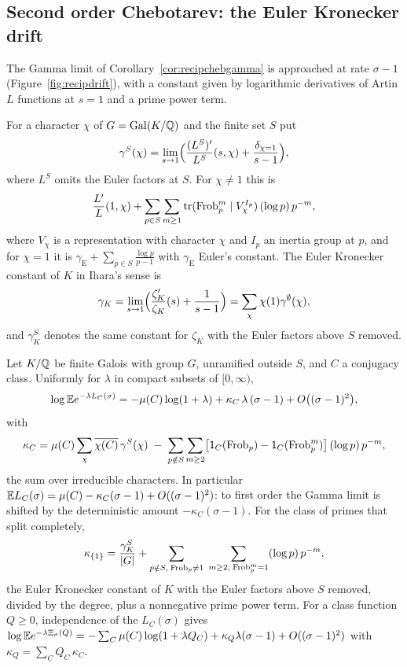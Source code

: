 \subsection{Second order Chebotarev: the Euler Kronecker drift}

The Gamma limit of Corollary~\ref{cor:recipchebgamma} is approached at rate $\sigma-1$ (Figure~\ref{fig:recipdrift}), with a constant given by logarithmic derivatives of Artin $L$ functions at $s=1$ and a prime power term.

For a character $\chi$ of $G=\operatorname{Gal}(K/\mathbb{Q})$ and the finite set $S$ put
\[
\gamma^S(\chi)=\lim_{s\to1}\Bigl(\frac{(L^S)'}{L^S}(s,\chi)+\frac{\delta_{\chi=1}}{s-1}\Bigr),
\]
where $L^S$ omits the Euler factors at $S$. For $\chi\ne1$ this is
\[
\frac{L'}L(1,\chi)+\sum_{p\in S}\sum_{m\ge1}\operatorname{tr}(\operatorname{Frob}_p^m\mid V_\chi^{I_p})\,(\log p)\,p^{-m},
\]
where $V_\chi$ is a representation with character $\chi$ and $I_p$ an inertia group at $p$, and for $\chi=1$ it is $\gamma_{\mathrm E}+\sum_{p\in S}\frac{\log p}{p-1}$ with $\gamma_{\mathrm E}$ Euler's constant. The Euler Kronecker constant of $K$ in Ihara's sense \cite{ihara2006} is
\[
\gamma_K=\lim_{s\to1}\Bigl(\frac{\zeta_K'}{\zeta_K}(s)+\frac1{s-1}\Bigr)=\sum_\chi\chi(1)\gamma^\emptyset(\chi),
\]
and $\gamma_K^S$ denotes the same constant for $\zeta_K$ with the Euler factors above $S$ removed.

\begin{theorem}\label{thm:recipdrift}
Let $K/\mathbb{Q}$ be finite Galois with group $G$, unramified outside $S$, and $C$ a conjugacy class. Uniformly for $\lambda$ in compact subsets of $[0,\infty)$,
\[
\log\mathbb{E} e^{-\lambda L_C(\sigma)}=-\mu(C)\log(1+\lambda)+\kappa_C\,\lambda\,(\sigma-1)+O\bigl((\sigma-1)^2\bigr),
\]
with
\[
\kappa_C=\mu(C)\sum_\chi\overline{\chi(C)}\,\gamma^S(\chi)\;-\;\sum_{p\notin S}\sum_{m\ge2}\bigl[\mathsf 1_C(\operatorname{Frob}_p)-\mathsf 1_C(\operatorname{Frob}_p^m)\bigr]\,(\log p)\,p^{-m},
\]
the sum over irreducible characters. In particular $\mathbb{E} L_C(\sigma)=\mu(C)-\kappa_C(\sigma-1)+O((\sigma-1)^2)$: to first order the Gamma limit is shifted by the deterministic amount $-\kappa_C(\sigma-1)$. For the class of primes that split completely,
\[
\kappa_{\{1\}}=\frac{\gamma_K^S}{|G|}+\sum_{p\notin S,\;\operatorname{Frob}_p\ne1}\;\sum_{m\ge2,\;\operatorname{Frob}_p^m=1}(\log p)\,p^{-m},
\]
the Euler Kronecker constant of $K$ with the Euler factors above $S$ removed, divided by the degree, plus a nonnegative prime power term. For a class function $Q\ge0$, independence of the $L_C(\sigma)$ gives $\log\mathbb{E} e^{-\lambda\Xi_\sigma(Q)}=-\sum_C\mu(C)\log(1+\lambda Q_C)+\kappa_Q\lambda(\sigma-1)+O((\sigma-1)^2)$ with $\kappa_Q=\sum_CQ_C\,\kappa_C$.
\end{theorem}

